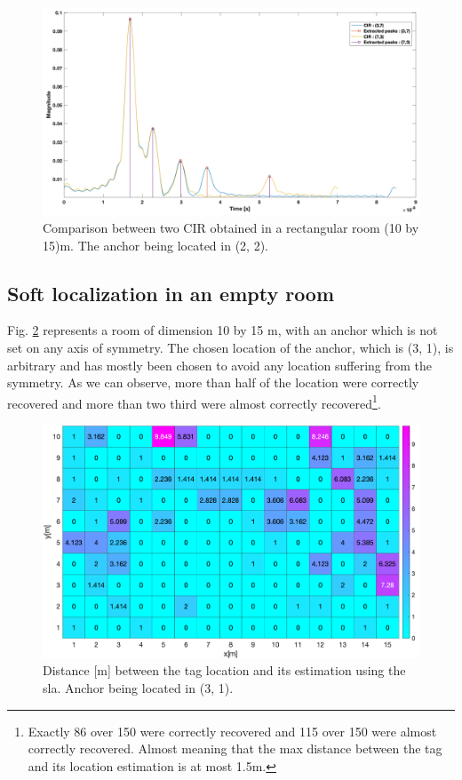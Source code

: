 \begin{figure}[H]
\centering
\includegraphics[width=.9\linewidth]{Images/cir_comparison_rect.png}
\caption{Comparison between two CIR obtained in a rectangular room (10 by 15)m. The anchor being located in (2, 2). \label{fig:rect_sym}}
\end{figure}

\subsection{Soft localization in an empty room}
\label{soft_empty_room}
Fig. \ref{fig:pos_ant_empty_non_sym} represents a room of dimension 10 by 15 m, with an anchor which is not set on any axis of symmetry. The chosen location of the anchor, which is (3, 1), is arbitrary and has mostly been chosen to avoid any location suffering from the symmetry. As we can observe, more than half of the location were correctly recovered and more than two third were almost correctly recovered\footnote{Exactly 86 over 150 were correctly recovered and 115 over 150 were almost correctly recovered. Almost meaning that the max distance between the tag and its location estimation is at most 1.5m.}.

\begin{figure}[H]
\centering
\includegraphics[width=\linewidth]{Images/no_more_name_idea.png}
\caption{Distance [m] between the tag location and its estimation using the \gls{sla}. Anchor being located in (3, 1). \label{fig:pos_ant_empty_non_sym}}
\end{figure}

